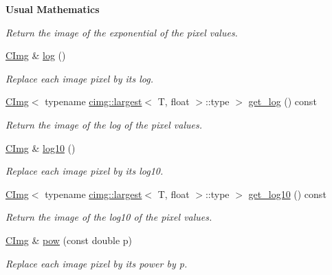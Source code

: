 \begin{Indent}{\bf Usual Mathematics}
\begin{DoxyCompactItemize}
\begin{DoxyCompactList}\small\item\em Return the image of the exponential of the pixel values. \item\end{DoxyCompactList}\item 
\hyperlink{structcimg__library_1_1_c_img}{CImg} \& \hyperlink{structcimg__library_1_1_c_img_aeddcf36f773b7ec82bd65af9f628184d}{log} ()
\begin{DoxyCompactList}\small\item\em Replace each image pixel by its log. \item\end{DoxyCompactList}\item 
\hyperlink{structcimg__library_1_1_c_img}{CImg}$<$ typename \hyperlink{structcimg__library_1_1cimg_1_1largest}{cimg::largest}$<$ T, float $>$::type $>$ \hyperlink{structcimg__library_1_1_c_img_a53e730201ad5c9241d9a6773c3e8dba2}{get\_\-log} () const 
\begin{DoxyCompactList}\small\item\em Return the image of the log of the pixel values. \item\end{DoxyCompactList}\item 
\hyperlink{structcimg__library_1_1_c_img}{CImg} \& \hyperlink{structcimg__library_1_1_c_img_ae3da2a5d00cb920aae818c767989541c}{log10} ()
\begin{DoxyCompactList}\small\item\em Replace each image pixel by its log10. \item\end{DoxyCompactList}\item 
\hyperlink{structcimg__library_1_1_c_img}{CImg}$<$ typename \hyperlink{structcimg__library_1_1cimg_1_1largest}{cimg::largest}$<$ T, float $>$::type $>$ \hyperlink{structcimg__library_1_1_c_img_a8821a674a3637957192a39ddfea16439}{get\_\-log10} () const 
\begin{DoxyCompactList}\small\item\em Return the image of the log10 of the pixel values. \item\end{DoxyCompactList}\item 
\hyperlink{structcimg__library_1_1_c_img}{CImg} \& \hyperlink{structcimg__library_1_1_c_img_a067f4006eacbc322ce61bafebe7bd340}{pow} (const double p)
\begin{DoxyCompactList}\small\item\em Replace each image pixel by its power by {\ttfamily p}. \item\end{DoxyCompactList}\item 

\end{DoxyCompactItemize}
\end{Indent}
